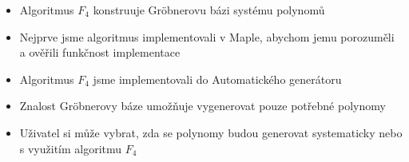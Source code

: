 \documentclass[cmpiitalkstyle, 25pt]{cmptalk}
\begin{document}
\begin{cmptalkslide}[Algoritmus $F_4$]
  \begin{itemize}
    \item Algoritmus $F_4$ \cite{F4} konstruuje Gr\"obnerovu bázi systému polynomů
    \item Nejprve jsme algoritmus implementovali v Maple, abychom jemu porozuměli a ověřili funkčnost implementace
    \item Algoritmus $F_4$ jsme implementovali do Automatického generátoru \cite{AutoGen}
    \item Znalost Gr\"obnerovy báze umožňuje vygenerovat pouze potřebné polynomy
    \item Uživatel si může vybrat, zda se polynomy budou generovat systematicky nebo s využitím algoritmu $F_4$
  \end{itemize}


\end{cmptalkslide}

\end{document}
